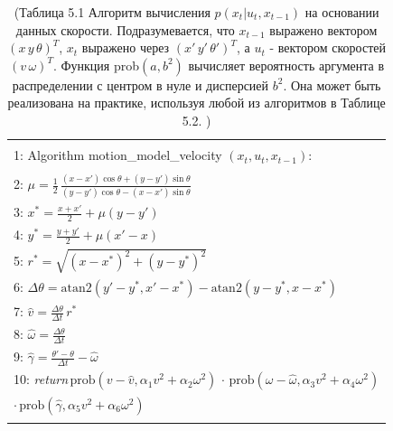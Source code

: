 \documentclass[10pt,a4paper]{article}
\begin{document}
\begin{table}[H]
\begin{center}
\begin{tabular}{|l|}
\hline
{}\\
1: \hspace{3mm} Algorithm motion\_model\_velocity $(x_t,u_t,x_{t-1}):$ \\
{}\\
2: \hspace{7mm} 
$\mu=\frac{1}{2}\,\frac{(x-x')\cos\theta+(y-y')\sin\theta}{(y-y')\cos\theta-(x-x')\sin\theta}$\\
3: \hspace{7mm} $x^*=\frac{x+x'}{2}+\mu(y-y')$\\
4: \hspace{7mm} $y^*=\frac{y+y'}{2}+\mu(x'-x)$\\
5: \hspace{7mm} $r^*=\sqrt{(x-x^*)^2+(y-y^*)^2}$\\
6: \hspace{7mm}  $\varDelta\theta=\text{atan}2(y'-y^*,x'-x^*)-\text{atan}2(y-y^*,x-x^*)$\\
7:  \hspace{8mm}$\hat{v}=\frac{\varDelta\theta}{\varDelta t}\,r^*$\\
8: \hspace{8mm}$\hat{\omega}=\frac{\varDelta\theta}{\varDelta t}$\\
9: \hspace{8mm}$\hat{\gamma}=\frac{\theta'-\theta}{\varDelta t}-\hat{\omega}$\\
10:\hspace{6mm}
\textit{return}\,$\text{prob}(v-\hat{v},\alpha_1v^2+\alpha_2\omega^2)\,\cdot\,\text{prob}(\omega-\hat{\omega},\alpha_3v^2+\alpha_4\omega^2)$\\
\hspace{21mm}$\cdot\,\text{prob}(\hat{\gamma},\alpha_5v^2+\alpha_6\omega^2)$\\
{}\\
\hline
\end{tabular}
\caption{(Таблица 5.1 Алгоритм вычисления $p(x_t | u_t, x_{t-1})$ на основании данных скорости.
Подразумевается, что $x_{t-1}$ выражено вектором $(x\,y\, \theta)^T$, $x_t$ выражено через
$(x'\,y'\,\theta')^T$, а $u_t$ - вектором скоростей $(v\,\omega)^T$. Функция prob$(a, b^2)$ вычисляет вероятность аргумента в распределении с центром в нуле и дисперсией $b^2$. Она может быть реализована на практике, используя любой из алгоритмов в Таблице 5.2.
	)}
\end{center}
\end{table}
\end{document}
